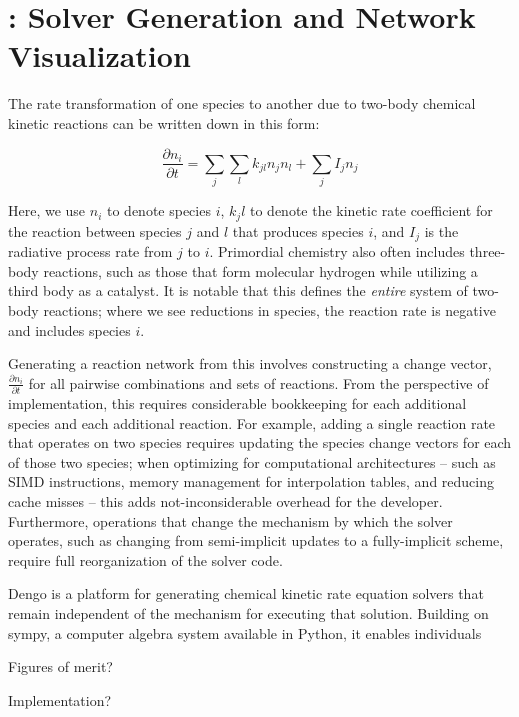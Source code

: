 \section{\dengo{}: Solver Generation and Network Visualization}


The rate transformation of one species to another due to two-body chemical kinetic
reactions can be written down in this form:

$$
\frac{\partial n_i }{\partial t} = \sum_{j}\sum_{l} k_{jl}n_{j}n_{l} + \sum_{j}I_{j}n_{j}
$$

Here, we use $n_{i}$ to denote species $i$, ${k_jl}$ to denote the kinetic rate
coefficient for the reaction between species $j$ and $l$ that produces species
$i$, and $I_{j}$ is the radiative process rate from $j$ to $i$.  Primordial
chemistry also often includes three-body reactions, such as those that
form molecular hydrogen while utilizing a third body as a catalyst.  It is
notable that this defines the \textit{entire} system of two-body reactions;
where we see reductions in species, the reaction rate is negative and includes
species ${i}$.


Generating a reaction network from this involves constructing a change vector,
$\frac{\partial n_i}{\partial t}$ for all pairwise combinations and sets of
reactions.  From the perspective of implementation, this requires considerable
bookkeeping for each additional species and each additional reaction.  For
example, adding a single reaction rate that operates on two species requires
updating the species change vectors for each of those two species; when
optimizing for computational architectures -- such as SIMD instructions, memory
management for interpolation tables, and reducing cache misses -- this adds
not-inconsiderable overhead for the developer.  Furthermore, operations that
change the mechanism by which the solver operates, such as changing from
semi-implicit updates to a fully-implicit scheme, require full reorganization
of the solver code.

Dengo is a platform for generating chemical kinetic rate equation solvers that
remain independent of the mechanism for executing that solution.  Building on
sympy, a computer algebra system available in Python, it enables individuals


Figures of merit?

Implementation?
